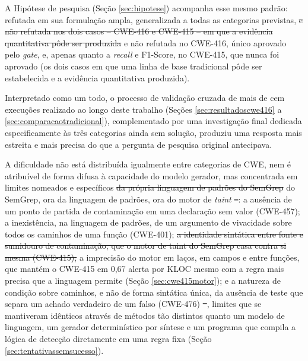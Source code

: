 \documentclass[
    12pt,                %
    openright,           %
    oneside,             %
    a4paper,             %
    english,             %
    brazil               %
]{abntex2}
\newcommand{\antigo}[1]{\sout{#1}}
\newcommand{\novo}[1]{{\color{red}#1}}
\begin{document}
\par
A Hipótese de pesquisa (Seção \ref{sec:hipotese}) acompanha esse mesmo padrão: refutada em sua formulação ampla, generalizada a todas as categorias previstas, \antigo{e não refutada nos dois casos -- CWE-416 e CWE-415 -- em que a evidência quantitativa pôde ser produzida} \novo{e não refutada no CWE-416, único aprovado pelo \textit{gate}, e, apenas quanto a \textit{recall} e F1-Score, no CWE-415, que nunca foi aprovado (os dois casos em que uma linha de base tradicional pôde ser estabelecida e a evidência quantitativa produzida)}.
\par
Interpretado como um todo, o processo de validação cruzada de mais de cem execuções realizado ao longo deste trabalho (Seções \ref{sec:resultadoscwe416} a \ref{sec:comparacaotradicional}), complementado por uma investigação final dedicada especificamente às três categorias ainda sem solução, produziu uma resposta mais estreita e mais precisa do que a pergunta de pesquisa original antecipava.
\par
A dificuldade não está distribuída igualmente entre categorias de CWE, nem é atribuível de forma difusa à capacidade do modelo gerador, mas concentrada em limites nomeados e específicos \antigo{da própria linguagem de padrões do SemGrep} \novo{do SemGrep, ora da linguagem de padrões, ora do motor de \textit{taint}}\antigo{ --}\novo{:} a ausência de um ponto de partida de contaminação em uma declaração sem valor (CWE-457); a inexistência, na linguagem de padrões, de um argumento de vivacidade sobre todos os caminhos de uma função (CWE-401); \antigo{a identidade sintática entre fonte e sumidouro de contaminação, que o motor de taint do SemGrep casa contra si mesma (CWE-415);} \novo{a imprecisão do motor em laços, em campos e entre funções, que mantém o CWE-415 em 0,67 alerta por KLOC mesmo com a regra mais precisa que a linguagem permite (Seção \ref{sec:cwe415motor});} e a natureza de condição sobre caminhos, e não de forma sintática única, da ausência de teste que separa um achado verdadeiro de um falso (CWE-476)\antigo{ --}, limites que se mantiveram idênticos através de métodos tão distintos quanto um modelo de linguagem, um gerador determinístico por síntese e um programa que compila a lógica de detecção diretamente em uma regra fixa (Seção \ref{sec:tentativassemsucesso}).
\end{document}
